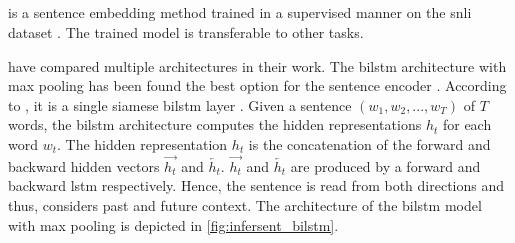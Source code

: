 \subsection{\infersent{}}\label{subsec:inferSent}

\infersent{} is a sentence embedding method trained in a supervised manner on the \ac{snli} dataset \cite{inferSent2018, HfsentTrans2019}.
The trained model is transferable to other tasks.




\citeauthor{inferSent2018} have compared multiple architectures in their work.
The \ac{bilstm} architecture with max pooling has been found the best option for the sentence encoder \cite{inferSent2018}.
According to \citeauthor{HfsentTrans2019}, it is a single siamese \ac{bilstm} layer \cite{HfsentTrans2019}.
Given a sentence $(w_1, w_2, ..., w_T)$ of $T$ words, the \ac{bilstm} architecture computes the hidden representations $h_t$ for each word $w_t$.
The hidden representation $h_t$ is the concatenation of the forward and backward hidden vectors $\overrightarrow{h_t}$ and $\overleftarrow{h_t}$.
$\overrightarrow{h_t}$ and $\overleftarrow{h_t}$ are produced by a forward and backward \ac{lstm} respectively.
Hence, the sentence is read from both directions and thus, considers past and future context.
The architecture of the \ac{bilstm} model with max pooling is depicted in \autoref{fig:infersent_bilstm}.

